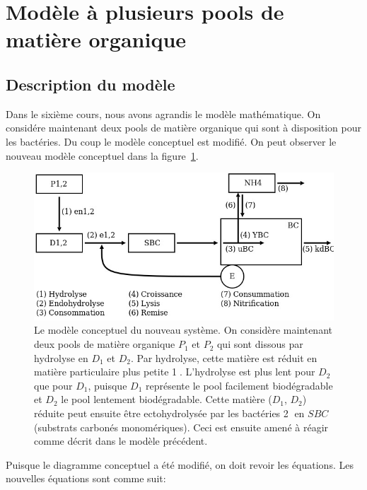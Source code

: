 \newpage
\section{Mod\`ele \`a plusieurs pools de matière organique}
\subsection{Description du mod\`ele}

\par{
Dans le sixième cours, nous avons agrandis le modèle mathématique. On considére maintenant deux pools de
matière organique qui sont à disposition pour les bact\'eries. Du coup le modèle conceptuel est modifi\'e.
On peut observer le nouveau modèle conceptuel dans la figure~\ref{fig:partie2diagconc}.
}

\begin{figure}[h!]
  \includegraphics[width=\textwidth]{partie2/scan1.jpg}
  \caption{Le modèle conceptuel du nouveau système. On consid\`ere maintenant deux pools de matière organique $P_1$ et $P_2$ qui sont dissous par hydrolyse en
$D_1$ et $D_2$. Par hydrolyse, cette matière est réduit en mati\`ere particulaire plus petite
\textcircled{1}. L'hydrolyse est plus lent pour $D_2$ que pour $D_1$, puisque $D_1$ repr\'esente le pool
facilement biodégradable et $D_2$ le pool lentement biodégradable. Cette matière ($D_1$, $D_2$) r\'eduite peut
ensuite être ectohydrolys\'ee par les bactéries \textcircled{2} en $SBC$ (substrats carbonés monomériques).
Ceci est ensuite amené à réagir comme décrit dans le modèle précédent.
}
  \label{fig:partie2diagconc}
\end{figure}

\par{
Puisque le diagramme conceptuel a \'et\'e modifi\'e, on doit revoir les équations. Les nouvelles
équations sont comme suit:
}

